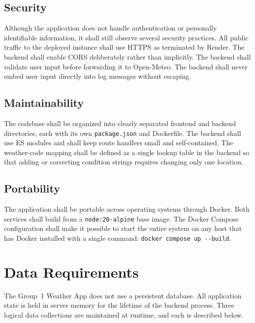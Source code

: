 \documentclass[11pt,letterpaper]{article}
\begin{document}
\subsection{Security}
Although the application does not handle authentication or personally identifiable information, it shall still observe several security practices. All public traffic to the deployed instance shall use HTTPS as terminated by Render. The backend shall enable CORS deliberately rather than implicitly. The backend shall validate user input before forwarding it to Open-Meteo. The backend shall never embed user input directly into log messages without escaping.

\subsection{Maintainability}
The codebase shall be organized into clearly separated frontend and backend directories, each with its own \texttt{package.json} and Dockerfile. The backend shall use ES modules and shall keep route handlers small and self-contained. The weather-code mapping shall be defined as a single lookup table in the backend so that adding or correcting condition strings requires changing only one location.

\subsection{Portability}
The application shall be portable across operating systems through Docker. Both services shall build from a \texttt{node:20-alpine} base image. The Docker Compose configuration shall make it possible to start the entire system on any host that has Docker installed with a single command: \texttt{docker compose up -{}-build}.

\section{Data Requirements}
The Group~1 Weather App does not use a persistent database. All application state is held in server memory for the lifetime of the backend process. Three logical data collections are maintained at runtime, and each is described below.
\end{document}
